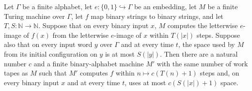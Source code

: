 \begin{theorem}
\label{Turing.FinTM.alphabet_reduction_spaceUsed}
\leanok
{}
Let $\Gamma$ be a finite alphabet, let $e:\{0,1\}\hookrightarrow\Gamma$ be an embedding,
let $M$ be a finite Turing machine over $\Gamma$, let $f$ map binary strings to binary
strings, and let $T,S:\mathbb{N}\to\mathbb{N}$. Suppose that on every binary input $x$,
$M$ computes the letterwise $e$-image of $f(x)$ from the letterwise $e$-image of $x$
within $T(|x|)$ steps. Suppose also that on every input word $y$ over $\Gamma$ and at
every time $t$, the space used by $M$ from its initial configuration on $y$ is at most
$S(|y|)$. Then there are a natural number $c$ and a finite binary-alphabet machine $M'$
with the same number of work tapes as $M$ such that $M'$ computes $f$ within $n\mapsto
c(T(n)+1)$ steps and, on every binary input $x$ and at every time $t$, uses at most
$c(S(|x|)+1)$ space.
\end{theorem}
